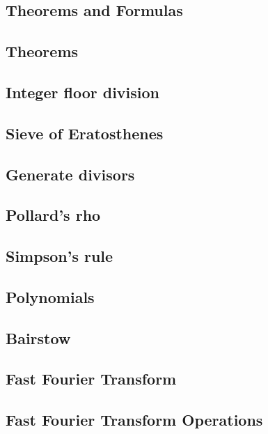 \subsection{Theorems and Formulas}

\subsection{Theorems}
\subsection{Integer floor division}
\subsection{Sieve of Eratosthenes}
\subsection{Generate divisors}
\subsection{Pollard's rho}
\subsection{Simpson's rule}
\subsection{Polynomials}
\subsection{Bairstow}
\subsection{Fast Fourier Transform}
\subsection{Fast Fourier Transform Operations}
